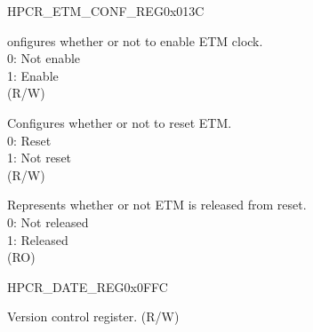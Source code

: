 \begin{register}{H}{PCR\_ETM\_CONF\_REG}{0x013C}\label{regdesc:PCRETMCONFREG}
%
%
%
%
\regnewline%
\begin{regdesc}\begin{reglist}
\label{fielddesc:PCRETMCLKEN}\item [PCR\_ETM\_CLK\_EN] onfigures whether or not to enable ETM clock. \\
0: Not enable\\
1: Enable\\ (R/W)
\label{fielddesc:PCRETMRSTEN}\item [PCR\_ETM\_RST\_EN] Configures whether or not to reset ETM.\\
0: Reset\\
1: Not reset\\(R/W)
\label{fielddesc:PCRETMREADY}\item [PCR\_ETM\_READY] Represents whether or not ETM is released from reset.\\
0: Not released\\
1: Released\\ (RO)
\end{reglist}\end{regdesc}
\end{register}




\begin{register}{H}{PCR\_DATE\_REG}{0x0FFC}\label{regdesc:PCRDATEREG}
%
%
\regnewline%
\begin{regdesc}\begin{reglist}
\label{fielddesc:PCRDATE}\item [PCR\_DATE] Version control register. (R/W)
\end{reglist}\end{regdesc}
\end{register}
